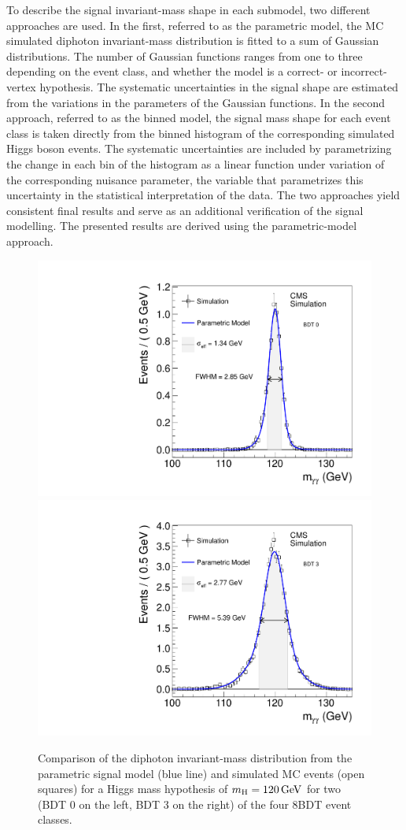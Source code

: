\documentclass[11pt,twoside,a4paper,cmspaper,final,collab]{cms-tdr}
\begin{document}
To describe the signal invariant-mass shape in each submodel, two different approaches are
used. In the first, referred to as the parametric model, the MC simulated  diphoton invariant-mass
distribution is fitted to a sum of Gaussian distributions. The number
of Gaussian functions ranges from one to three depending on the event class, and whether the model is a
correct- or incorrect-vertex hypothesis.
The systematic uncertainties in the signal shape are estimated from the
variations in the parameters of the Gaussian functions.
In the second approach, referred to as the binned model,  the
signal mass shape for each event class is taken directly from the  binned histogram
of the corresponding simulated Higgs boson events.
The systematic uncertainties are included
by parametrizing the change in each bin of the histogram as a linear function under variation
of the corresponding nuisance parameter, \ie the variable that parametrizes this uncertainty
in the statistical interpretation of the data.
The two approaches yield consistent final results and serve as an additional verification
of the signal modelling. The presented results are derived using the parametric-model approach.

\begin{figure}[htbp]
  \begin{center}
    \includegraphics[width=0.49\linewidth]{figures/hgg_effsigmamvacat0_8TeV.pdf}
    \includegraphics[width=0.49\linewidth]{figures/hgg_effsigmamvacat3_8TeV.pdf}
    \caption{
      Comparison of the diphoton invariant-mass distribution from the parametric signal model (blue line) and simulated
      MC events (open squares) for a Higgs mass
      hypothesis of $m_{\mathrm{H}}=120\,\text{Ge\hspace{-.08em}V}$ for two (BDT 0 on the left, BDT 3 on the right)
      of the four 8\TeV BDT event classes.
    }
    \label{fig:hgg_sigmodel}
  \end{center}
\end{figure}
\end{document}
